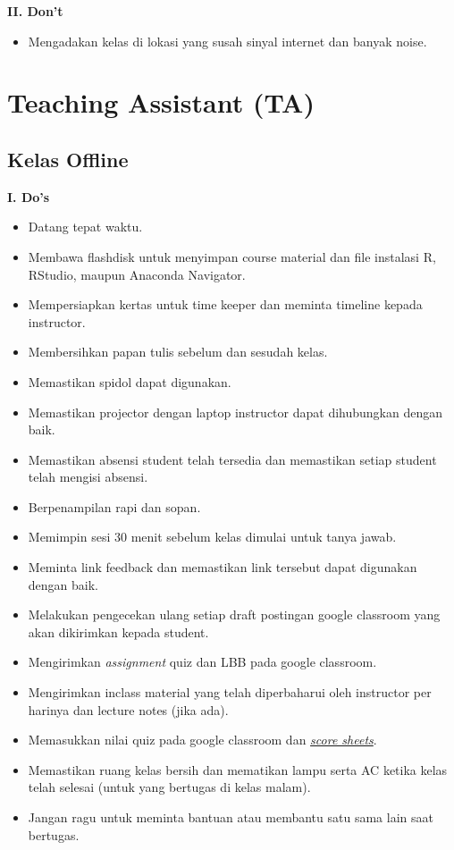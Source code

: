 \documentclass[
]{book}
\providecommand{\tightlist}{%
  \setlength{\itemsep}{0pt}\setlength{\parskip}{0pt}}
\begin{document}
\textbf{II. Don't}

\begin{itemize}
\tightlist
\item
  Mengadakan kelas di lokasi yang susah sinyal internet dan banyak noise.
\end{itemize}

\hypertarget{teaching-assistant-ta}{%
\section{Teaching Assistant (TA)}\label{teaching-assistant-ta}}

\hypertarget{kelas-offline-4}{%
\subsection{Kelas Offline}\label{kelas-offline-4}}

\textbf{I. Do's}

\begin{itemize}
\tightlist
\item
  Datang tepat waktu.
\item
  Membawa flashdisk untuk menyimpan course material dan file instalasi R, RStudio, maupun Anaconda Navigator.
\item
  Mempersiapkan kertas untuk time keeper dan meminta timeline kepada instructor.
\item
  Membersihkan papan tulis sebelum dan sesudah kelas.
\item
  Memastikan spidol dapat digunakan.
\item
  Memastikan projector dengan laptop instructor dapat dihubungkan dengan baik.
\item
  Memastikan absensi student telah tersedia dan memastikan setiap student telah mengisi absensi.
\item
  Berpenampilan rapi dan sopan.
\item
  Memimpin sesi 30 menit sebelum kelas dimulai untuk tanya jawab.
\item
  Meminta link feedback dan memastikan link tersebut dapat digunakan dengan baik.
\item
  Melakukan pengecekan ulang setiap draft postingan google classroom yang akan dikirimkan kepada student.
\item
  Mengirimkan \emph{assignment} quiz dan LBB pada google classroom.
\item
  Mengirimkan inclass material yang telah diperbaharui oleh instructor per harinya dan lecture notes (jika ada).
\item
  Memasukkan nilai quiz pada google classroom dan \href{https://docs.google.com/spreadsheets/d/1cGJ0pn9k9gKCBnceWVwaL9D7BBDMNjLh8uPYlaBlJi8/edit\#gid=1518964141}{\emph{score sheets}}.
\item
  Memastikan ruang kelas bersih dan mematikan lampu serta AC ketika kelas telah selesai (untuk yang bertugas di kelas malam).
\item
  Jangan ragu untuk meminta bantuan atau membantu satu sama lain saat bertugas.
\end{itemize}
\end{document}
